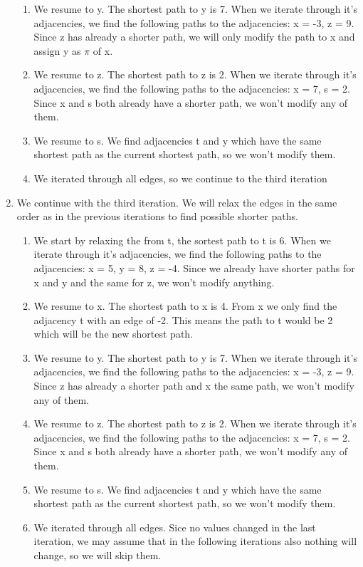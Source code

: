 \documentclass{article}
\begin{document}
\begin{enumerate}
\begin{enumerate}[label=(\roman*)]
            \item We resume to y. The shortest path to y is 7. When we iterate through it's adjacencies, we find the following paths to the adjacencies: x = -3, z = 9. Since z has already a shorter path, we will only modify the path to x and assign y as $\pi$ of x.
            \item We resume to z. The shortest path to z is 2. When we iterate through it's adjacencies, we find the following paths to the adjacencies: x = 7, s = 2. Since x and s both already have a shorter path, we won't modify any of them.
            \item We resume to s. We find adjacencies t and y which have the same shortest path as the current shortest path, so we won't modify them.
            \item We iterated through all edges, so we continue to the third iteration
        \end{enumerate}
    \item We continue with the third iteration. We will relax the edges in the same order as in the previous iterations to find possible shorter paths.
        \begin{enumerate}[label=(\roman*)]
            \item We start by relaxing the from t, the sortest path to t is 6. When we iterate through it's adjacencies, we find the following paths to the adjacencies: x = 5, y = 8, z = -4. Since we already have shorter paths for x and y and the same for z, we won't modify anything.
            \item We resume to x. The shortest path to x is 4. From x we only find the adjacency t with an edge of -2. This means the path to t would be 2 which will be the new shortest path.
            \item We resume to y. The shortest path to y is 7. When we iterate through it's adjacencies, we find the following paths to the adjacencies: x = -3, z = 9. Since z has already a shorter path and x the same path, we won't modify any of them.
            \item We resume to z. The shortest path to z is 2. When we iterate through it's adjacencies, we find the following paths to the adjacencies: x = 7, s = 2. Since x and s both already have a shorter path, we won't modify any of them.
            \item We resume to s. We find adjacencies t and y which have the same shortest path as the current shortest path, so we won't modify them.
            \item We iterated through all edges. Sice no values changed in the last iteration, we may assume that in the following iterations also nothing will change, so we will skip them.

\end{enumerate}
\end{enumerate}
\end{document}
